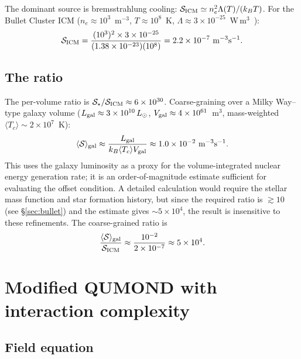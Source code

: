 \documentclass[aps,prd,twocolumn,superscriptaddress,nofootinbib]{revtex4-2}
\newcommand{\Ssrc}{\mathcal{S}}
\begin{document}
The dominant source is bremsstrahlung cooling: $\Ssrc_{\rm ICM}\simeq n_e^2\Lambda(T)/(k_BT)$. For the Bullet Cluster ICM ($n_e\approx 10^3$~m$^{-3}$, $T\approx 10^8$~K, $\Lambda\approx 3\times 10^{-25}$~W\,m$^3$~\cite{Sutherland1993}):
\begin{equation}
\Ssrc_{\rm ICM}=\frac{(10^3)^2\times 3\times 10^{-25}}{(1.38\times 10^{-23})(10^8)}=2.2\times 10^{-7}~\text{m}^{-3}\text{s}^{-1}.
\label{eq:SICM}
\end{equation}

\subsection{The ratio}

The per-volume ratio is $\Ssrc_\star/\Ssrc_{\rm ICM}\approx 6\times 10^{30}$. Coarse-graining over a Milky Way--type galaxy volume ($L_{\rm gal}\approx 3\times 10^{10}\,L_\odot$, $V_{\rm gal}\approx 4\times 10^{61}$~m$^3$, mass-weighted $\langle T_c\rangle\sim 2\times 10^7$~K):
\begin{equation}
\langle\Ssrc\rangle_{\rm gal}\approx\frac{L_{\rm gal}}{k_B\langle T_c\rangle V_{\rm gal}}\approx 1.0\times 10^{-2}~\text{m}^{-3}\text{s}^{-1}.
\label{eq:Sgal}
\end{equation}
This uses the galaxy luminosity as a proxy for the volume-integrated nuclear energy generation rate; it is an order-of-magnitude estimate sufficient for evaluating the offset condition. A detailed calculation would require the stellar mass function and star formation history, but since the required ratio is $\gtrsim 10$ (see \S\ref{sec:bullet}) and the estimate gives $\sim 5\times 10^4$, the result is insensitive to these refinements.
The coarse-grained ratio is
\begin{equation}
\frac{\langle\Ssrc\rangle_{\rm gal}}{\Ssrc_{\rm ICM}}\approx\frac{10^{-2}}{2\times 10^{-7}}\approx 5\times 10^4.
\label{eq:ratio}
\end{equation}

\section{Modified QUMOND with interaction complexity}
\label{sec:modqumond}

\subsection{Field equation}
\end{document}
